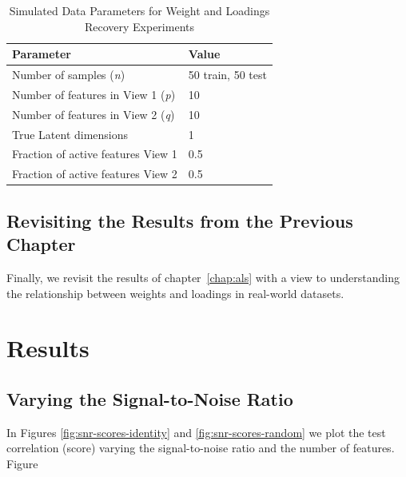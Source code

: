 \begin{table}
    \centering
    \caption{Simulated Data Parameters for Weight and Loadings Recovery Experiments}
    \begin{tabular}{| l | l |}
        \hline
        \textbf{Parameter}                        & \textbf{Value}                               \\
        \hline
        Number of samples (\textit{n})            & 50 train, 50 test                            \\
        Number of features in View 1 (\textit{p}) & 10 \\
        Number of features in View 2 (\textit{q}) & 10 \\
        True Latent dimensions                    & 1                                            \\
        Fraction of active features View 1            & 0.5                                          \\
        Fraction of active features View 2            & 0.5                                          \\
        \hline
    \end{tabular}\label{tab:simulated-data-parameters}
\end{table}

\subsection{Revisiting the Results from the Previous Chapter}

Finally, we revisit the results of chapter~\ref{chap:als} with a view to understanding the relationship between \gls{weights} and \gls{loadings} in real-world datasets.


\section{Results}

\subsection{Varying the Signal-to-Noise Ratio}

In Figures \ref{fig:snr-scores-identity} and \ref{fig:snr-scores-random} we plot the test correlation (score) varying the signal-to-noise ratio and the number of features.
Figure 

